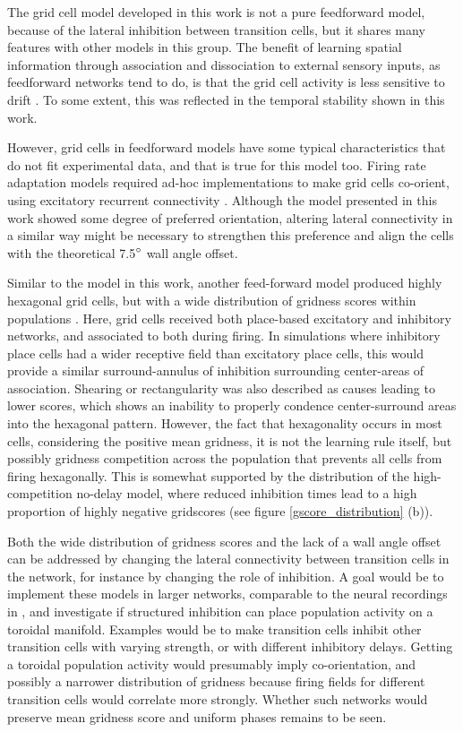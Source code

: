 \documentclass{article}
\begin{document}
    The grid cell model developed in this work is not a pure feedforward model, because of the lateral inhibition between transition cells, but it shares many features with other models in this group. The benefit of learning spatial information through association and dissociation to external sensory inputs, as feedforward networks tend to do, is that the grid cell activity is less sensitive to drift \parencite{Mulas2016}. To some extent, this was reflected in the temporal stability shown in this work.

    However, grid cells in feedforward models have some typical characteristics that do not fit experimental data, and that is true for this model too. Firing rate adaptation models required ad-hoc implementations to make grid cells co-orient, using excitatory recurrent connectivity \parencite{Barry2006,Si2013}. Although the model presented in this work showed some degree of preferred orientation, altering lateral connectivity in a similar way might be necessary to strengthen this preference and align the cells with the theoretical 7.5\(\degree\) wall angle offset.

    Similar to the model in this work, another feed-forward model produced highly hexagonal grid cells, but with a wide distribution of gridness scores within populations \parencite{Weber2018}. Here, grid cells received both place-based excitatory and inhibitory networks, and associated to both during firing. In simulations where inhibitory place cells had a wider receptive field than excitatory place cells, this would provide a similar surround-annulus of inhibition surrounding center-areas of association. Shearing or rectangularity was also described as causes leading to lower scores, which shows an inability to properly condence center-surround areas into the hexagonal pattern. However, the fact that hexagonality occurs in most cells, considering the positive mean gridness, it is not the learning rule itself, but possibly gridness competition across the population that prevents all cells from firing hexagonally. This is somewhat supported by the distribution of the high-competition no-delay model, where reduced inhibition times lead to a high proportion of highly negative gridscores (see figure \ref{gscore_distribution} (b)).

    Both the wide distribution of gridness scores and the lack of a wall angle offset can be addressed by changing the lateral connectivity between transition cells in the network, for instance by changing the role of inhibition. A goal would be to implement these models in larger networks, comparable to the neural recordings in \parencite{Gardner2022}, and investigate if structured inhibition can place population activity on a toroidal manifold. Examples would be to make transition cells inhibit other transition cells with varying strength, or with different inhibitory delays. Getting a toroidal population activity would presumably imply co-orientation, and possibly a narrower distribution of gridness because firing fields for different transition cells would correlate more strongly. Whether such networks would preserve mean gridness score and uniform phases remains to be seen.
\end{document}
